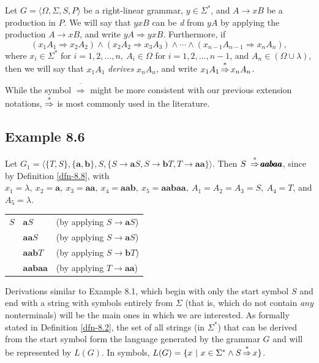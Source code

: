 \begin{dfn}\label{dfn-8.8}
Let $G=\langle\Omega,\Sigma,S,P\rangle$ be a right-linear grammar, $y\in\Sigma^*$,
and $A \rightarrow xB$ be a production in $P$. We will say that $yxB$ can be
\emph{d} from $yA$ by applying the production $A
\rightarrow xB$, and write $yA \Rightarrow yxB$. Furthermore, if
\[ (x_1A_1\Rightarrow x_2A_2) \wedge (x_2A_2\Rightarrow x_3A_3) \wedge \cdots
	\wedge (x_{n-1}A_{n-1}\Rightarrow x_nA_n), \]
where $x_i\in\Sigma^*$ for $i=1,2,\ldots,n,\ A_i\in\Omega$ for $i=1,2,\ldots,n-1$,
and $A_n\in(\Omega\cup\lambda)$, then we will say that $x_1A_1$ \emph{derives}
$x_nA_n$, and write $x_1A_1 \operatorname{\overset{*}{\Rightarrow}} x_nA_n$.
\end{dfn}
While the symbol $\overline{\Rightarrow}$ might be more consistent with our
previous extension notations, $\operatorname{\overset{*}{\Rightarrow}}$ is most commonly used in the
literature.

\subsection*{Example 8.6}

Let $G_1 = \langle\{T,S\},\{\pmb{a},\pmb{b}\},S,\{S\rightarrow\pmb{a}S,S
\rightarrow\pmb{b}T,T\rightarrow\pmb{aa}\}\rangle$. Then $S\ \operatorname{\overset{*}{\Rightarrow}}\pmb{aabaa}$,
since by Definition \ref{dfn-8.8}, with $x_1=\lambda,\ x_2=\pmb{a},\ x_3=\pmb{aa},\ x_4 =
\pmb{aab},\ x_5=\pmb{aabaa},\ A_1=A_2=A_3=S,\ A_4=T$, and $A_5=\lambda$.
\begin{center}\begin{tabular}{r@{ $\Rightarrow$ }ll}
$S$ & $\pmb{a}S$& (by applying $S\rightarrow\pmb{a}S$) \\
& $\pmb{aa}S$& (by applying $S\rightarrow\pmb{a}S$) \\
& $\pmb{aab}T$& (by applying $S\rightarrow\pmb{b}T$) \\
& $\pmb{aabaa}$& (by applying $T\rightarrow\pmb{aa}$)
\end{tabular}\end{center}
Derivations similar to Example 8.1, which begin with only the start symbol $S$
and end with a string with symbols entirely from $\Sigma$ (that is, which do not
contain \emph{any} nonterminals) will be the main ones in which we are interested.
As formally stated in Definition \ref{dfn-8.2}, the set of all strings (in $\Sigma^*$)
that can be derived from the start symbol form the language generated by the
grammar $G$ and will be represented by $L(G)$. In symbols, $L(G)=\{x\ |\ x \in
\Sigma^* \wedge S \operatorname{\overset{*}{\Rightarrow}} x\}$.

